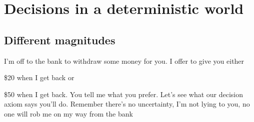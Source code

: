 %
%



\section{Decisions in a deterministic world}
\subsection{Different magnitudes}
I'm off to the bank to withdraw some money for you. I offer to give you either
\bi
\item[(1)] \$20 when I 
get back or 
\item[(2)] \$50 when I get back. You tell me what you prefer.
\ei
Let's see what our decision axiom says you'll do. Remember there's no uncertainty, I'm not lying to you, no one will rob me on my way from the bank \etc

